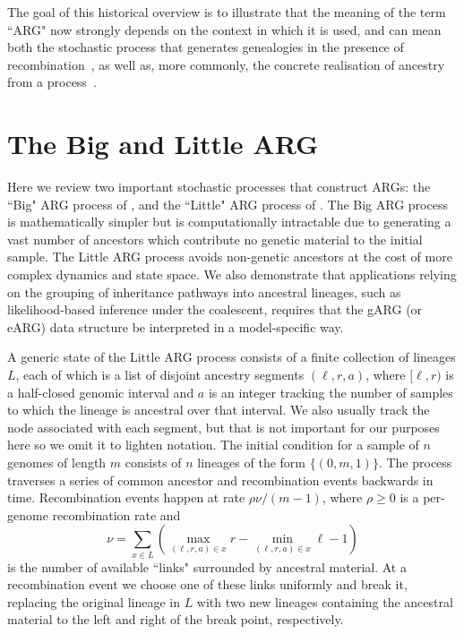 \documentclass{article}
\begin{document}
The goal of this historical overview is to illustrate that the meaning of the term ``ARG" now strongly
depends on the context in which it is used, and can mean both the
stochastic process that generates genealogies in the presence of
recombination~\citep[e.g.][]{nordborg2000linkage,birkner2013ancestral,
wilton2015smc,griffiths2016coalescent},
as well as, more commonly, the concrete realisation of ancestry from a
process~\citep[e.g.][]{gusfield2014recombinatorics,mathieson2020ancestry,brandt2021evaluation}.

\section{The Big and Little ARG}
\label{sec-big-and-little-arg}
Here we review two important stochastic processes that construct ARGs:
the ``Big" ARG process of \cite{griffiths1997ancestral}, and the ``Little" ARG process of
 \cite{hudson1983properties}. The Big ARG process is mathematically simpler
 but is computationally intractable due to generating a vast number of ancestors
 which contribute no genetic material to the initial sample.
The Little ARG process avoids non-genetic ancestors at the cost of more complex
dynamics and state space. We also demonstrate that applications relying on the grouping of inheritance pathways into ancestral lineages, such as likelihood-based inference under the coalescent, requires that the
gARG (or eARG) data structure be interpreted in a model-specific way.

A generic state of the Little ARG process consists of a finite collection of lineages $L$,
each of which is a list of disjoint ancestry segments $(\ell, r, a)$, where
$[\ell, r)$ is a half-closed genomic interval and $a$ is an integer
tracking the number of samples to which the lineage is ancestral over that interval.
We also usually track the node associated with each segment, but
that is not important for our purposes here so we omit it to lighten notation.
The initial condition for a sample of $n$ genomes of length $m$ consists of $n$ lineages
of the form $\{(0, m, 1)\}$. The process traverses a series of common ancestor and
recombination events backwards in time.
Recombination events happen at rate $\rho \nu / (m - 1)$,
where $\rho \geq 0$ is a per-genome recombination rate and
 \[
 \nu = \sum_{x \in L}\left( \max_{(\ell, r, a) \in x}r
     - \min_{(\ell, r, a) \in x}\ell - 1 \right)
 \]
 is the number of available ``links" surrounded by ancestral material.
 At a recombination event we choose one of these links uniformly and break it,
 replacing the original lineage in $L$ with two new lineages containing the ancestral material
 to the left and right of the break point, respectively.
\end{document}
